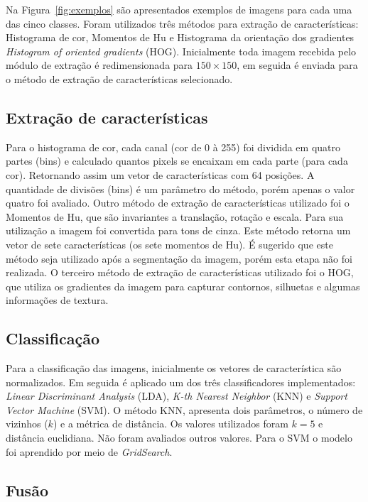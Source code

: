 \documentclass[paper=a4, fontsize=11pt]{scrartcl} %
\numberwithin{equation}{section} %
\numberwithin{figure}{section} %
\numberwithin{table}{section} %
\begin{document}
Na Figura~\ref{fig:exemplos} são apresentados exemplos de imagens para cada uma das cinco classes.
Foram utilizados três métodos para extração de características: Histograma de cor, Momentos de Hu e Histograma da orientação dos gradientes {\it Histogram of oriented gradients} (HOG).
Inicialmente toda imagem recebida pelo módulo de extração é redimensionada para $150 \times 150$, em seguida é enviada para o método de extração de características selecionado.

\subsection{Extração de características}

Para o histograma de cor, cada canal (cor de 0 à 255) foi dividida em quatro partes (bins) e calculado quantos pixels se encaixam em cada parte (para cada cor). 
Retornando assim um vetor de características com 64 posições.
A quantidade de divisões (bins) é um parâmetro do método, porém apenas o valor quatro foi avaliado.
Outro método de extração de características utilizado foi o Momentos de Hu, que são invariantes a translação, rotação e escala.
Para sua utilização a imagem foi convertida para tons de cinza. Este método retorna um vetor de sete características (os sete momentos de Hu).
É sugerido que este método seja utilizado após a segmentação da imagem, porém esta etapa não foi realizada.
O terceiro método de extração de características utilizado foi o HOG, que utiliza os gradientes da imagem para capturar contornos, silhuetas e algumas informações de textura.

\subsection{Classificação}

Para a classificação das imagens, inicialmente os vetores de característica são normalizados.
Em seguida é aplicado um dos três classificadores implementados: {\it Linear Discriminant Analysis} (LDA), {\it K-th Nearest Neighbor} (KNN) e {\it Support Vector Machine } (SVM).
O método KNN, apresenta dois parâmetros, o número de vizinhos ($k$) e a métrica de distância.
Os valores utilizados foram $k=5$ e distância euclidiana. Não foram avaliados outros valores.
Para o SVM o modelo foi aprendido por meio de {\it GridSearch}.

\subsection {Fusão}
\end{document}
